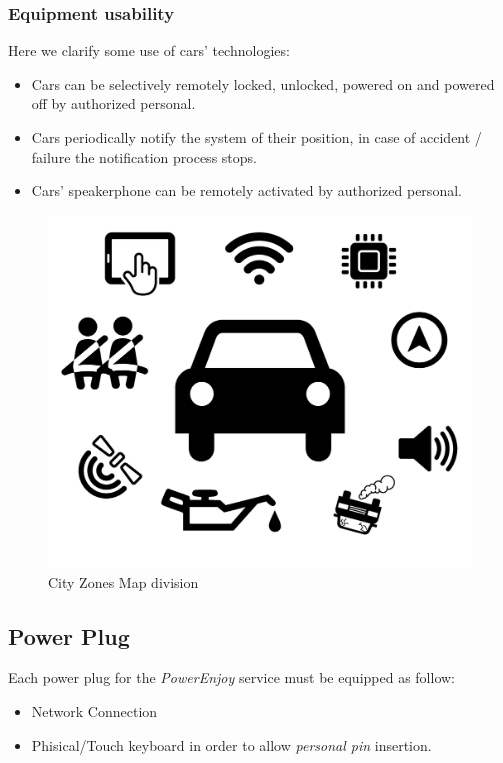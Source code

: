 \documentclass[english]{article}
\newcommand{\powerenjoy}{\textit{PowerEnjoy }}
\newcommand{\personalpin}{\textit{personal pin }}
\begin{document}
	\subsubsection{Equipment usability}
	Here we clarify some use of cars' technologies:
	\begin{itemize}
		\item Cars can be selectively remotely locked, unlocked, powered on and powered off by authorized personal.
		\item Cars periodically notify the system of their position, in case of accident / failure the notification process stops.
		\item Cars' speakerphone can be remotely activated by authorized personal.
	\end{itemize}
	\begin{figure}[H]
		\centering
		\includegraphics[scale=0.1]{auto.pdf}%
		\caption{City Zones Map division}
	\end{figure}

		
\subsection{Power Plug}
	Each power plug for the \powerenjoy service must be equipped as follow:
		\begin{itemize}
			\item Network Connection
			\item Phisical/Touch keyboard in order to allow \personalpin insertion.
		\end{itemize}
\end{document}
